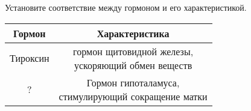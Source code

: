 Установите соответствие между гормоном и его характеристикой.\\

\begin{tabular}{|c|c|}
    \hline
    Гормон & Характеристика \\
    \hline
    Тироксин & \makecell{гормон щитовидной железы, \\ ускоряющий обмен веществ} \\
    \hline
    ? & \makecell{Гормон гипоталамуса, \\ стимулирующий сокращение матки} \\
    \hline
\end{tabular} \\
